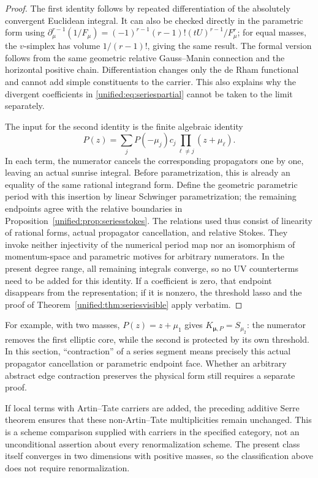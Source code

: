 \documentclass[11pt,a4paper,oneside]{article}
\theoremstyle{plain}
\theoremstyle{definition}
\theoremstyle{remark}
\numberwithin{equation}{section}
\begin{document}
\begin{proof}
The first identity follows by repeated differentiation of the absolutely convergent Euclidean integral.
It can also be checked directly in the parametric form using
$\partial_\mu^{r-1}(1/F_\mu)
=(-1)^{r-1}(r-1)!(tU)^{r-1}/F_\mu^r$;
for equal masses, the $v$-simplex has volume $1/(r-1)!$, giving the same result.
The formal version follows from the same geometric relative Gauss--Manin connection and the horizontal positive chain.
Differentiation changes only the de Rham functional and cannot add simple constituents to the carrier.
This also explains why the divergent coefficients in \eqref{unified:eq:seriespartial} cannot be taken to the limit separately.

The input for the second identity is the finite algebraic identity
\[
 P(z)=\sum_j P(-\mu_j)c_j\prod_{\ell\ne j}(z+\mu_\ell).
\]
In each term, the numerator cancels the corresponding propagators one by one, leaving an actual sunrise integral.
Before parametrization, this is already an equality of the same rational integrand form.
Define the geometric parametric period with this insertion by linear Schwinger parametrization;
the remaining endpoints agree with the relative boundaries in Proposition~\ref{unified:prop:seriesstokes}.
The relations used thus consist of linearity of rational forms, actual propagator cancellation, and relative Stokes.
They invoke neither injectivity of the numerical period map nor an isomorphism of momentum-space and parametric motives for arbitrary numerators.
In the present degree range, all remaining integrals converge, so no UV counterterms need to be added for this identity.
If a coefficient is zero, that endpoint disappears from the representation;
if it is nonzero, the threshold lasso and the proof of Theorem~\ref{unified:thm:seriesvisible} apply verbatim.
\end{proof}

For example, with two masses, $P(z)=z+\mu_1$ gives $K_{\boldsymbol\mu,P}=S_{\mu_2}$:
the numerator removes the first elliptic core, while the second is protected by its own threshold.
In this section, ``contraction'' of a series segment means precisely this actual propagator cancellation or parametric endpoint face.
Whether an arbitrary abstract edge contraction preserves the physical form still requires a separate proof.

If local terms with Artin--Tate carriers are added, the preceding additive Serre theorem ensures that these
non-Artin--Tate multiplicities remain unchanged. This is a scheme comparison supplied with carriers in the specified category,
not an unconditional assertion about every renormalization scheme.
The present class itself converges in two dimensions with positive masses, so the classification above does not require renormalization.
\end{document}
